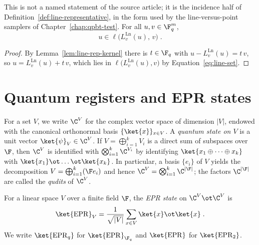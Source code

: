 \begin{lemma}\label{lem:line-rep-incidence}
	\leanok
	This is not a named statement of the source article; it is the incidence half of Definition~\ref{def:line-representative}, in the form used by the line-versus-point samplers of Chapter~\ref{chap:qpbt-test}. For all $u, v \in \F_q^m$,
	\[
		u \in \ell\bigl(L^{\mathrm{Ln}}_v(u),\, v\bigr)\;.
	\]
\end{lemma}
\begin{proof}
	\leanok
	By Lemma~\ref{lem:line-rep-kernel} there is $t \in \F_q$ with $u - L^{\mathrm{Ln}}_v(u) = t\,v$, so $u = L^{\mathrm{Ln}}_v(u) + t\,v$, which lies in $\ell\bigl(L^{\mathrm{Ln}}_v(u), v\bigr)$ by Equation~\eqref{eq:line-set}.
\end{proof}

\section{Quantum registers and EPR states}
\label{sec:lin-reg}

\begin{definition}\label{def:lin-reg}
	For a set $V$, we write $\C^V$ for the complex vector space of dimension
	$|V|$, endowed with the canonical orthonormal basis
	$\{\ket{x}\}_{x \in V}$. A \emph{quantum state on $V$} is a unit vector
	$\ket{\psi}_V \in \C^V$. If $V = \bigoplus_{i=1}^k V_i$ is a direct sum of
	subspaces over $\F$, then $\C^V$ is identified with
	$\bigotimes_{i=1}^k \C^{V_i}$ by identifying
	$\ket{x_1 \oplus \dots \oplus x_k}$ with
	$\ket{x_1} \ot \dots \ot \ket{x_k}$. In particular, a basis $\{e_i\}$ of
	$V$ yields the decomposition $V = \bigoplus_{i=1}^k (\F e_i)$ and hence
	$\C^V = \bigotimes_{i=1}^k \C^{|\F|}$; the factors $\C^{|\F|}$ are called
	the \emph{qudits} of $\C^V$.
\end{definition}

\begin{definition}\label{def:EPR}
	\leanok
	For a linear space $V$ over a finite field $\F$, the \emph{EPR state} on
	$\C^V \ot \C^V$ is
	\[
		\ket{\mathrm{EPR}}_V
		= \frac{1}{\sqrt{|V|}} \sum_{x \in V} \ket{x} \ot \ket{x}\;.
	\]
	We write $\ket{\mathrm{EPR}_q}$ for $\ket{\mathrm{EPR}}_{\F_q}$ and
	$\ket{\mathrm{EPR}}$ for $\ket{\mathrm{EPR}_2}$.
\end{definition}


